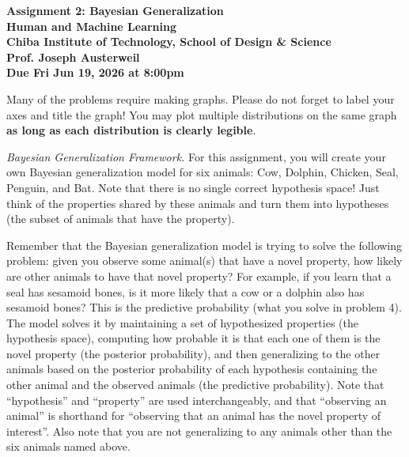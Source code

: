 \documentclass[11pt]{article}
\begin{document}
\begin{centering}
{\large \bf Assignment 2: Bayesian Generalization \\ Human and Machine Learning \\ Chiba Institute of Technology, School of Design \& Science \\ Prof. Joseph Austerweil \\ Due Fri Jun 19, 2026 at 8:00pm \\}
\end{centering}

\noindent Many of the problems require making graphs. Please do not forget to label your axes and title the graph! You may plot multiple distributions on the same graph {\bf as long as each distribution is clearly legible}.

\vspace{1em}
{\em Bayesian Generalization Framework.} For this assignment, you will create your own Bayesian generalization model for six animals: Cow, Dolphin, Chicken, Seal, Penguin, and Bat. Note that there is no single correct hypothesis space! Just think of the properties shared by these animals and turn them into hypotheses (the subset of animals that have the property).

Remember that the Bayesian generalization model is trying to solve the following problem: given you observe some animal(s) that have a novel property, how likely are other animals to have that novel property? For example, if you learn that a seal has sesamoid bones, is it more likely that a cow or a dolphin also has sesamoid bones? This is the predictive probability (what you solve in problem 4). The model solves it by maintaining a set of hypothesized properties (the hypothesis space), computing how probable it is that each one of them is the novel property (the posterior probability), and then generalizing to the other animals based on the posterior probability of each hypothesis containing the other animal and the observed animals (the predictive probability). Note that ``hypothesis'' and ``property'' are used interchangeably, and that ``observing an animal'' is shorthand for ``observing that an animal has the novel property of interest''. Also note that you are not generalizing to any animals other than the six animals named above.
\end{document}
